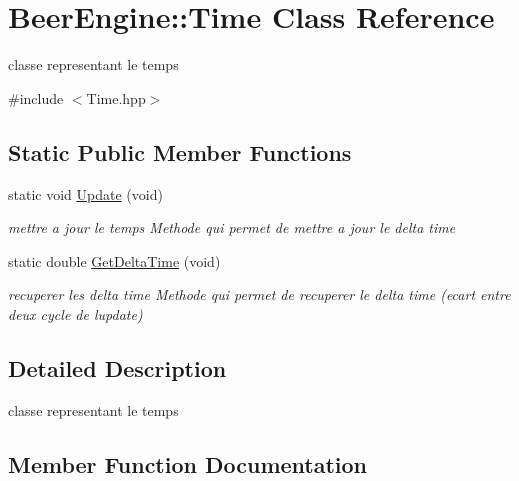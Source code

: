 \hypertarget{class_beer_engine_1_1_time}{}\section{Beer\+Engine\+:\+:Time Class Reference}
\label{class_beer_engine_1_1_time}


classe representant le temps  




{\ttfamily \#include $<$Time.\+hpp$>$}

\subsection*{Static Public Member Functions}
\begin{DoxyCompactItemize}
\item 
static void \mbox{\hyperlink{class_beer_engine_1_1_time_abc2653b297b763e819ac708600cccf95}{Update}} (void)
\begin{DoxyCompactList}\small\item\em mettre a jour le temps Methode qui permet de mettre a jour le delta time \end{DoxyCompactList}\item 
static double \mbox{\hyperlink{class_beer_engine_1_1_time_a0ade54bfb934ff9e3771912b3408e594}{Get\+Delta\+Time}} (void)
\begin{DoxyCompactList}\small\item\em recuperer les delta time Methode qui permet de recuperer le delta time (ecart entre deux cycle de l\textquotesingle{}update) \end{DoxyCompactList}\end{DoxyCompactItemize}


\subsection{Detailed Description}
classe representant le temps 

\subsection{Member Function Documentation}
\mbox{\label{class_beer_engine_1_1_time_a0ade54bfb934ff9e3771912b3408e594}} 
